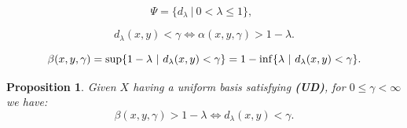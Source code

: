 \documentclass[10pt,a4paper]{amsart}
\newtheorem{proposition}{Proposition}
\renewcommand{\a}{\ensuremath{\alpha}}
\renewcommand{\b}{\ensuremath{\beta}}
\renewcommand{\inf}{\myinf}
\renewcommand{\l}{\ensuremath{\lambda}}
\DeclareMathOperator*{\myinf}{in\vphantom{p}f}
\begin{document}
\begin{equation}\label{uassociated}
\Psi = \{ d_\l \ | \ 0 < \l \leq 1 \}, \ \ 
\end{equation}

\begin{equation}\label{equivug}
d_\l (x,y) < \gamma \Leftrightarrow \a(x,y,\gamma) > 1-\l.
\end{equation}

\begin{equation}\label{ubeta}
\b(x,y,\gamma) = \sup \{1 - \l \ | \ d_\l(x, y) < \gamma\} = 1 - \inf  \{\l \ | \ d_\l (x, y) < \gamma\}.
\end{equation}

\begin{proposition}\label{uequivbeta}
Given $X$ having a uniform basis satisfying {\bf(UD)},
for $0 \leq \gamma < \infty$ we have:
$$
\b(x,y,\gamma) > 1 - \l   \Leftrightarrow  d_\l(x, y) < \gamma.
$$
\end{proposition}
\end{document}
